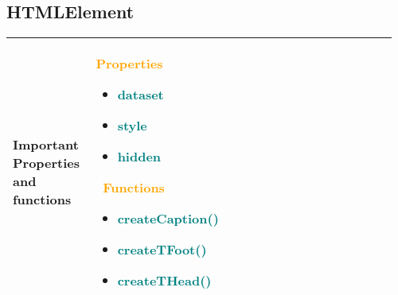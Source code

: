 \documentclass[main.tex,fontsize=8pt,paper=a4,paper=portrait,DIV=calc,]{scrartcl}
\begin{document}
\begin{table}[!ht]
\subsection{HTMLElement}
\begin{tabular}{|m{0.2\linewidth}|m{0.755\linewidth}|}
\hline
Important Properties and functions & 
\textcolor{orange}{\textbf{Properties}}
\begin{itemize}
  \item \textcolor{teal}{dataset} 
  \item \textcolor{teal}{style} 
  \item \textcolor{teal}{hidden}
\end{itemize}
\, \newline
\textcolor{orange}{Functions}\newline
\begin{itemize}
  \item \textcolor{teal}{createCaption()}
  \item \textcolor{teal}{createTFoot()}
  \item \textcolor{teal}{createTHead()}
  \vspace{-3mm}
\end{itemize}\\
\hline
\end{tabular}

\end{table}
\end{document}
